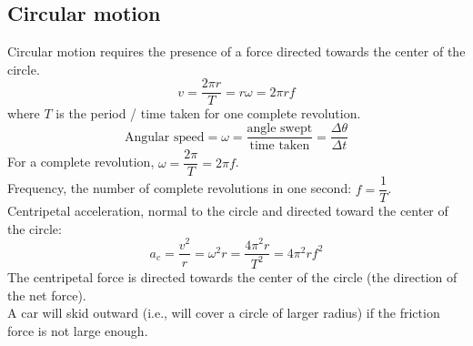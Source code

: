 \documentclass[a4paper,12pt]{article}
\begin{document}
\subsection{Circular motion}
Circular motion requires the presence of a force directed towards the center of the circle.
\[v=\dfrac{2\pi r}{T}=r\omega=2\pi rf\]
where $T$ is the period / time taken for one complete revolution.\\
\[\text{Angular speed} = \omega =\dfrac{\text{angle swept}}{\text{time taken}}=\dfrac{\Delta\theta}{\Delta t}\]
For a complete revolution, $\omega=\dfrac{2\pi}{T}=2\pi f$.\\
Frequency, the number of complete revolutions in one second: $f=\dfrac{1}{T}$.\\
Centripetal acceleration, normal to the circle and directed toward the center of the circle:
\[a_c=\dfrac{v^2}{r}=\omega^2 r=\dfrac{4\pi ^2 r}{T^2}=4\pi^2rf^2\]
The centripetal force is directed towards the center of the circle (the direction of the net force). \\
A car will skid outward (i.e., will cover a circle of larger radius) if the friction force is not large enough.
\end{document}
